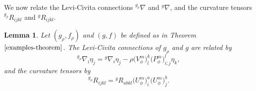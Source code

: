 \documentclass[10pt,a4paper]{amsart}
\numberwithin{equation}{section}
\newtheorem{Lemma}[Theorem]{Lemma}
\begin{document}
We now relate the Levi-Civita connections ${ }^{g_\rho} \nabla$ and ${ }^{g} \nabla$, and the curvature tensors ${ }^{g_\rho} R_{i j k l}$ and ${ }^{g} R_{i j k l}$.

\begin{Lemma}Let $(g_\rho,f_\rho)$ and $(g,f)$ be defined as in Theorem~$\ref{examples-theorem}$. The Levi-Civita connections of $g_\rho$ and $g$ are related by
\begin{equation}\label{connection-conformally-flat}
{ }^{g_\rho} \nabla_{i} \eta_{j}={ }^{g} \nabla_{i} \eta_{j}-\rho \big(V_\phi^m\big)_{l}^{k} \big(P_\phi^m\big)_{i; j}^{l} \eta_{k},
\end{equation} and the curvature tensors by
\begin{equation}\label{curvature-conformally-flat}
{ }^{g_\rho} R_{i j k l}={ }^{g} R_{a b k l} \big(U_\phi^m\big)_{i}^{a} \big(U_\phi^m\big)_{j}^{b}.
\end{equation}
\end{Lemma}
\end{document}
